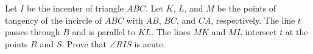 Let $I$ be the incenter of triangle $ABC$. Let $K$, $L$, and $M$ be the points of tangency of the incircle of $ABC$ with $AB$, $BC$, and $CA$, respectively. The line $t$ passes through $B$ and is parallel to $KL$. The lines $MK$ and $ML$ intersect $t$ at the points $R$ and $S$. Prove that $\angle RIS$ is acute.
